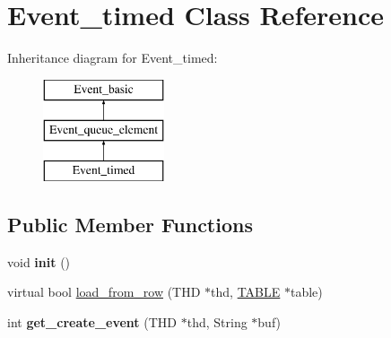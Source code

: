 \hypertarget{classEvent__timed}{}\section{Event\+\_\+timed Class Reference}
\label{classEvent__timed}
Inheritance diagram for Event\+\_\+timed\+:\begin{figure}[H]
\begin{center}
\leavevmode
\includegraphics[height=3.000000cm]{classEvent__timed}
\end{center}
\end{figure}
\subsection*{Public Member Functions}
\begin{DoxyCompactItemize}
\item 
void {\bfseries init} ()
\item 
virtual bool \mbox{\hyperlink{group__Event__Scheduler_gaf182a3b09598193b22ee09f0661b4dc3}{load\+\_\+from\+\_\+row}} (T\+HD $\ast$thd, \mbox{\hyperlink{structTABLE}{T\+A\+B\+LE}} $\ast$table)
\item 
int {\bfseries get\+\_\+create\+\_\+event} (T\+HD $\ast$thd, String $\ast$buf)
\end{DoxyCompactItemize}

